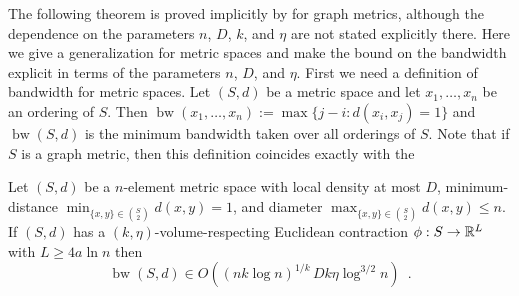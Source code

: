 \documentclass{patmorin}
\DeclareMathOperator{\bw}{bw}
\begin{document}
The following theorem is proved implicitly by \citet{feige:approximating} for graph metrics, although the dependence on the parameters $n$, $D$, $k$, and $\eta$ are not stated explicitly there. Here we give a generalization for metric spaces and make the bound on the bandwidth explicit in terms of the parameters $n$, $D$, and $\eta$.  First we need a definition of bandwidth for metric spaces.  Let $(S,d)$ be a metric space and let $x_1,\ldots,x_n$ be an ordering of $S$.  Then $\bw(x_1,\ldots,x_n):=\max\{j-i:d(x_i,x_j)=1\}$ and $\bw(S,d)$ is the minimum bandwidth taken over all orderings of $S$.  Note that if $S$ is a graph metric, then this definition coincides exactly with the




\begin{thm}
  Let $(S,d)$ be a $n$-element metric space with local density at most $D$, minimum-distance $\min_{\{x,y\}\in\binom{S}{2}}d(x,y)=1$, and diameter $\max_{\{x,y\}\in\binom{S}{2}}d(x,y)\le n$.  If $(S,d)$ has a $(k,\eta)$-volume-respecting Euclidean contraction $\phi:S\to\mathbb{R}^L$ with $L\ge 4a\ln n$ then
  \[
    \bw(S,d) \in O((nk\log n)^{1/k}\,Dk\eta\log^{3/2} n) \enspace .
  \]
\end{thm}

\end{document}

